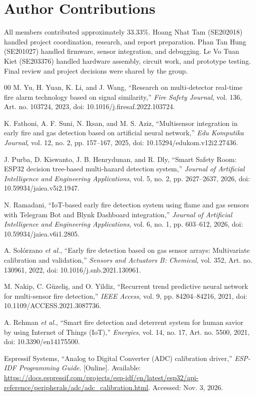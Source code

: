 \documentclass[12pt,a4paper]{article}
\begin{document}
\section*{Author Contributions}
All members contributed approximately 33.33\%. Hoang Nhat Tam (SE202018) handled project coordination, research, and report preparation. Phan Tan Hung (SE201027) handled firmware, sensor integration, and debugging. Le Vo Tuan Kiet (SE203376) handled hardware assembly, circuit work, and prototype testing. Final review and project decisions were shared by the group.

\begin{thebibliography}{00}
 M. Yu, H. Yuan, K. Li, and J. Wang, ``Research on multi-detector real-time fire alarm technology based on signal similarity,'' \emph{Fire Safety Journal}, vol. 136, Art. no. 103724, 2023, doi: 10.1016/j.firesaf.2022.103724.

 K. Fathoni, A. F. Suni, N. Iksan, and M. S. Aziz, ``Multisensor integration in early fire and gas detection based on artificial neural network,'' \emph{Edu Komputika Journal}, vol. 12, no. 2, pp. 157--167, 2025, doi: 10.15294/edukom.v12i2.27436.

 J. Purba, D. Kiswanto, J. B. Henrydunan, and R. Dly, ``Smart Safety Room: ESP32 decision tree-based multi-hazard detection system,'' \emph{Journal of Artificial Intelligence and Engineering Applications}, vol. 5, no. 2, pp. 2627--2637, 2026, doi: 10.59934/jaiea.v5i2.1947.

 N. Ramadani, ``IoT-based early fire detection system using flame and gas sensors with Telegram Bot and Blynk Dashboard integration,'' \emph{Journal of Artificial Intelligence and Engineering Applications}, vol. 6, no. 1, pp. 603--612, 2026, doi: 10.59934/jaiea.v6i1.2805.

 A. Sol\'orzano \emph{et al.}, ``Early fire detection based on gas sensor arrays: Multivariate calibration and validation,'' \emph{Sensors and Actuators B: Chemical}, vol. 352, Art. no. 130961, 2022, doi: 10.1016/j.snb.2021.130961.

 M. Nakip, C. G\"uzeli\c{s}, and O. Yildiz, ``Recurrent trend predictive neural network for multi-sensor fire detection,'' \emph{IEEE Access}, vol. 9, pp. 84204--84216, 2021, doi: 10.1109/ACCESS.2021.3087736.

 A. Rehman \emph{et al.}, ``Smart fire detection and deterrent system for human savior by using Internet of Things (IoT),'' \emph{Energies}, vol. 14, no. 17, Art. no. 5500, 2021, doi: 10.3390/en14175500.

 Espressif Systems, ``Analog to Digital Converter (ADC) calibration driver,'' \emph{ESP-IDF Programming Guide}. [Online]. Available: \url{https://docs.espressif.com/projects/esp-idf/en/latest/esp32/api-reference/peripherals/adc/adc_calibration.html}. Accessed: Nov. 3, 2026.
\end{thebibliography}
\end{document}

